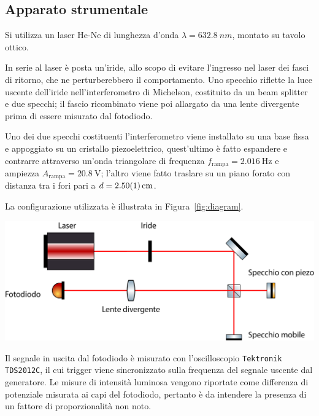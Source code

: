 \documentclass[10pt,oneside,a4paper]{article}
\newenvironment{Figure}
  {\par\medskip\noindent\minipage{\linewidth}}
  {\endminipage\par\medskip}
\begin{document}
\begin{multicols}{2}
\section{Apparato strumentale}

Si utilizza un laser He-Ne di lunghezza d'onda $\lambda = \SI{632.8}{nm}$, montato su tavolo ottico. 

In serie al laser è posta un'iride, allo scopo di evitare l'ingresso nel laser dei fasci di ritorno, che ne perturberebbero il comportamento. Uno specchio riflette la luce uscente dell'iride nell'interferometro di Michelson, costituito da un beam splitter e due specchi; il fascio ricombinato viene poi allargato da una lente divergente prima di essere misurato dal fotodiodo.

Uno dei due specchi costituenti l'interferometro viene installato su una base fissa e appoggiato su un cristallo piezoelettrico, quest'ultimo è fatto espandere e contrarre attraverso un'onda triangolare di frequenza $f_\mathrm{rampa} = \SI{2.016}{\hertz}$ e ampiezza $A_\mathrm{rampa} = \SI{20.8}{\volt}$; l'altro viene fatto traslare su un piano forato con distanza tra i fori pari a $d = \SI{2.50 \pm 0.01}{cm}$. 

La configurazione utilizzata è illustrata in Figura~\ref{fig:diagram}.

\begin{Figure}
	\begin{center}
	\includegraphics[width=\linewidth]{diagram.png}
	\label{fig:diagram}
	\end{center}
\end{Figure}

Il segnale in uscita dal fotodiodo è misurato con l'oscilloscopio \texttt{Tektronik TDS2012C}, il cui trigger viene sincronizzato sulla frequenza del segnale uscente dal generatore. Le misure di intensità luminosa vengono riportate come differenza di potenziale misurata ai capi del fotodiodo, pertanto è da intendere la presenza di un fattore di proporzionalità non noto.


\end{multicols}
\end{document}
